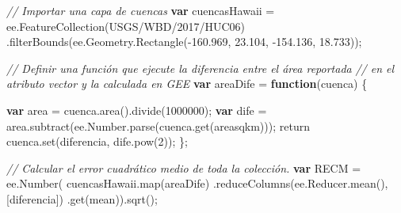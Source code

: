 \documentclass[
  12pt,
  letterpaper,
  twoside]{book}
\newenvironment{Shaded}{\begin{snugshade}}{\end{snugshade}}
\newcommand{\AttributeTok}[1]{\textcolor[rgb]{0.48,0.12,0.64}{#1}}
\newcommand{\CommentTok}[1]{\textcolor[rgb]{0.24,0.58,0.00}{\textit{#1}}}
\newcommand{\ControlFlowTok}[1]{\textcolor[rgb]{0.00,0.00,0.00}{#1}}
\newcommand{\DecValTok}[1]{\textcolor[rgb]{0.28,0.53,0.93}{#1}}
\newcommand{\FloatTok}[1]{\textcolor[rgb]{0.28,0.53,0.93}{#1}}
\newcommand{\FunctionTok}[1]{\textcolor[rgb]{0.48,0.12,0.64}{#1}}
\newcommand{\KeywordTok}[1]{\textcolor[rgb]{0.00,0.00,0.00}{\textbf{#1}}}
\newcommand{\NormalTok}[1]{#1}
\newcommand{\OperatorTok}[1]{\textcolor[rgb]{0.00,0.00,0.00}{#1}}
\newcommand{\StringTok}[1]{\textcolor[rgb]{0.87,0.29,0.22}{#1}}
\begin{document}
\begin{Shaded}
\begin{Highlighting}[]
\CommentTok{// Importar una capa de cuencas}
\KeywordTok{var}\NormalTok{ cuencasHawaii }\OperatorTok{=}\NormalTok{ ee}\OperatorTok{.}\FunctionTok{FeatureCollection}\NormalTok{(}\StringTok{\textquotesingle{}USGS/WBD/2017/HUC06\textquotesingle{}}\NormalTok{)}
  \OperatorTok{.}\FunctionTok{filterBounds}\NormalTok{(ee}\OperatorTok{.}\AttributeTok{Geometry}\OperatorTok{.}\FunctionTok{Rectangle}\NormalTok{(}\OperatorTok{{-}}\FloatTok{160.969}\OperatorTok{,} \FloatTok{23.104}\OperatorTok{,} \OperatorTok{{-}}\FloatTok{154.136}\OperatorTok{,} \FloatTok{18.733}\NormalTok{))}\OperatorTok{;}

\CommentTok{// Definir una función que ejecute la diferencia entre el área reportada }
\CommentTok{// en el atributo vector y la calculada en GEE}
\KeywordTok{var}\NormalTok{ areaDife }\OperatorTok{=} \KeywordTok{function}\NormalTok{(cuenca) \{}
 
  \KeywordTok{var}\NormalTok{ area }\OperatorTok{=}\NormalTok{ cuenca}\OperatorTok{.}\FunctionTok{area}\NormalTok{()}\OperatorTok{.}\FunctionTok{divide}\NormalTok{(}\DecValTok{1000000}\NormalTok{)}\OperatorTok{;}
  \KeywordTok{var}\NormalTok{ dife }\OperatorTok{=}\NormalTok{ area}\OperatorTok{.}\FunctionTok{subtract}\NormalTok{(ee}\OperatorTok{.}\AttributeTok{Number}\OperatorTok{.}\FunctionTok{parse}\NormalTok{(cuenca}\OperatorTok{.}\FunctionTok{get}\NormalTok{(}\StringTok{\textquotesingle{}areasqkm\textquotesingle{}}\NormalTok{)))}\OperatorTok{;}
  \ControlFlowTok{return}\NormalTok{ cuenca}\OperatorTok{.}\FunctionTok{set}\NormalTok{(}\StringTok{\textquotesingle{}diferencia\textquotesingle{}}\OperatorTok{,}\NormalTok{ dife}\OperatorTok{.}\FunctionTok{pow}\NormalTok{(}\DecValTok{2}\NormalTok{))}\OperatorTok{;}
\NormalTok{\}}\OperatorTok{;}

\CommentTok{// Calcular el error cuadrático medio de toda la colección.}
\KeywordTok{var}\NormalTok{ RECM }\OperatorTok{=}\NormalTok{ ee}\OperatorTok{.}\FunctionTok{Number}\NormalTok{(}
\NormalTok{  cuencasHawaii}\OperatorTok{.}\FunctionTok{map}\NormalTok{(areaDife)}
  \OperatorTok{.}\FunctionTok{reduceColumns}\NormalTok{(ee}\OperatorTok{.}\AttributeTok{Reducer}\OperatorTok{.}\FunctionTok{mean}\NormalTok{()}\OperatorTok{,}\NormalTok{ [}\StringTok{\textquotesingle{}diferencia\textquotesingle{}}\NormalTok{])}
  \OperatorTok{.}\FunctionTok{get}\NormalTok{(}\StringTok{\textquotesingle{}mean\textquotesingle{}}\NormalTok{))}\OperatorTok{.}\FunctionTok{sqrt}\NormalTok{()}\OperatorTok{;}
\end{Highlighting}
\end{Shaded}
\end{document}
